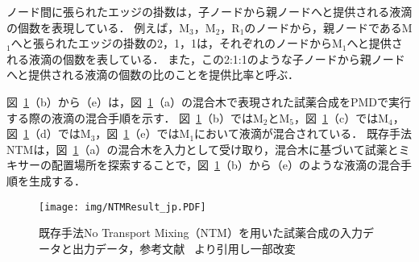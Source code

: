 ノード間に張られたエッジの掛数は，子ノードから親ノードへと提供される液滴の個数を表現している．
例えば，M$_3$，M$_2$，R$_1$のノードから，親ノードであるM$_1$へと張られたエッジの掛数の2，1，1は，それぞれのノードからM$_1$へと提供される液滴の個数を表している．
また，この2:1:1のような子ノードから親ノードへと提供される液滴の個数の比のことを提供比率と呼ぶ．

図~\ref{fig:NTM}（b）から（e）は，図~\ref{fig:NTM}（a）の混合木で表現された試薬合成をPMDで実行する際の液滴の混合手順を示す．
図~\ref{fig:NTM}（b）ではM$_2$とM$_5$，図~\ref{fig:NTM}（c）ではM$_4$，図~\ref{fig:NTM}（d）ではM$_3$，図~\ref{fig:NTM}（e）ではM$_1$において液滴が混合されている．
既存手法NTMは，図~\ref{fig:NTM}（a）の混合木を入力として受け取り，混合木に基づいて試薬とミキサーの配置場所を探索することで，図~\ref{fig:NTM}（b）から（e）のような液滴の混合手順を生成する．

\begin{figure}[tbp]
    \centering\texttt{[image: img/NTMResult\_jp.PDF]}
    \caption{既存手法No Transport Mixing（NTM）を用いた試薬合成の入力データと出力データ，参考文献~\cite{4} より引用し一部改変}\label{fig:NTM}
\end{figure}


